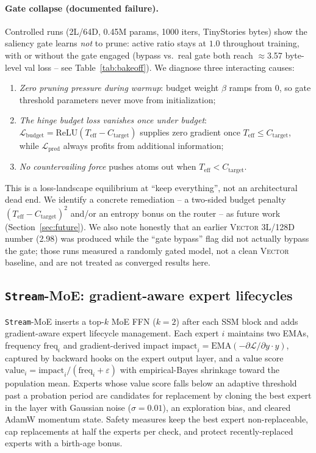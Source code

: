 \documentclass[11pt]{article}
\newcommand{\loss}{\mathcal{L}}
\newcommand{\Stream}{\texttt{Stream}}
\newcommand{\Vector}{{\scshape Vector}}
\begin{document}
\paragraph{Gate collapse (documented failure).}
Controlled runs (2L/64D, 0.45M params, 1000 iters, TinyStories bytes) show the
saliency gate learns \emph{not} to prune: active ratio stays at $1.0$ throughout
training, with or without the gate engaged (bypass vs.\ real gate both reach
$\approx$3.57 byte-level val loss -- see Table~\ref{tab:bakeoff}). We diagnose
three interacting causes:
\begin{enumerate}
  \item \emph{Zero pruning pressure during warmup}: budget weight $\beta$ ramps
        from 0, so gate threshold parameters never move from initialization;
  \item \emph{The hinge budget loss vanishes once under budget}:
        $\loss_{\text{budget}}=\text{ReLU}(T_{\text{eff}}-C_{\text{target}})$
        supplies zero gradient once $T_{\text{eff}}\le C_{\text{target}}$, while
        $\loss_{\text{pred}}$ always profits from additional information;
  \item \emph{No countervailing force} pushes atoms out when
        $T_{\text{eff}}<C_{\text{target}}$.
\end{enumerate}
This is a loss-landscape equilibrium at ``keep everything'', not an
architectural dead end. We identify a concrete remediation -- a two-sided
budget penalty $(T_{\text{eff}}-C_{\text{target}})^2$ and/or an entropy bonus on
the router -- as future work (Section~\ref{sec:future}). We also note honestly
that an earlier \Vector{} 3L/128D number (2.98) was produced while the ``gate
bypass'' flag did not actually bypass the gate; those runs measured a randomly
gated model, not a clean \Vector{} baseline, and are not treated as converged
results here.

\subsection{\Stream{}-MoE: gradient-aware expert lifecycles}\label{sec:moe}
\Stream{}-MoE inserts a top-$k$ MoE FFN ($k=2$) after each SSM block and adds
gradient-aware expert lifecycle management. Each expert $i$ maintains two EMAs,
frequency $\text{freq}_i$ and gradient-derived impact
$\text{impact}_i=\text{EMA}(-\partial \loss/\partial y\cdot y)$, captured by
backward hooks on the expert output layer, and a value score
$\text{value}_i=\text{impact}_i/(\text{freq}_i+\varepsilon)$ with empirical-Bayes
shrinkage toward the population mean. Experts whose value score falls below an
adaptive threshold past a probation period are candidates for replacement by
cloning the best expert in the layer with Gaussian noise
($\sigma=0.01$), an exploration bias, and cleared AdamW momentum state. Safety
measures keep the best expert non-replaceable, cap replacements at half the
experts per check, and protect recently-replaced experts with a birth-age bonus.
\end{document}

